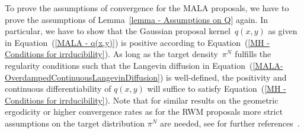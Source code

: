 To prove the assumptions of convergence for the MALA proposals, we have to prove the assumptions of Lemma~\ref{lemma - Assumptions on Q} again. In particular, we have to show that the Gaussian proposal kernel~$q(x,y)$  as given in Equation~(\ref{MALA - q(x,y)}) is positive according to Equation~(\ref{MH - Conditions for irrducibility}). As long as the target density~$\pi^N$ fulfills the regularity conditions such that the Langevin diffusion in Equation~(\ref{MALA-OverdampedContinuousLangevinDiffusion}) is well-defined, the positivity and continuous differentiability of $q(x,y)$ will suffice to satisfy Equation~(\ref{MH - Conditions for irrducibility}). Note that for similar results on the geometric ergodicity or higher convergence rates as for the RWM proposals more strict assumptions on the target distribution $ \pi^{N} $ are needed, see for further references~\autocite{RobertsTweedie1996}.